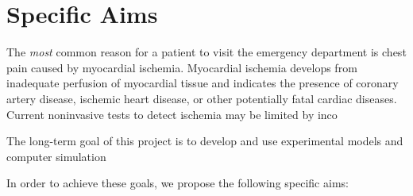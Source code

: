 %


%

\section{Specific Aims}

The \textit{most} common reason for a patient to visit the emergency
department is chest pain caused by myocardial ischemia. Myocardial ischemia
develops from inadequate perfusion of myocardial tissue and indicates the
presence of coronary artery disease, ischemic heart disease, or other
potentially fatal cardiac diseases. Current noninvasive tests to detect
ischemia may be limited by inco

The long-term goal of this project is to develop and use experimental
models and computer simulation


%

In order to achieve these goals, we propose the following specific aims: 
\vspace{-.1in} %

